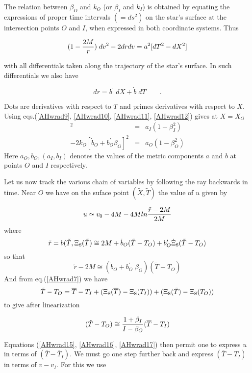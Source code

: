 \documentclass[12pt,oneside]{report}
\def\beq {\begin{equation}}
\def\feq {\end{equation}}
\begin{document}
{The relation between $ \beta_O $ and $ k_O$ (or $ \beta_I $
and $ k_I$) is obtained by equating the expressions  of proper time intervals
$(= ds^2)$  on the star's surface at the intersection
points $O$ and $I$, when expressed in both coordinate
systems. Thus

\beq (1 - {2 M \over r})\; dv^2 - 2 dr dv = a^2 [ d T^2 - d X^2
] \label{AHwrad11} \feq

\noindent with all differentials taken along the trajectory of
the star's surface. In such differentials we also have

\beq dr = b^\prime \; d X + {\dot b}\; d T \qquad .\label{AHwrad12} \feq

\noindent Dots are derivatives with respect to $T$ and primes derivatives 
with respect
to $X$. Using eqs.(\ref{AHwrad9}, \ref{AHwrad10}, \ref{AHwrad11}, \ref{AHwrad12}) gives
at $X = X_O$ 
\begin{eqnarray}
[ ( 1 - {2 M \over r_I}) \; k_I ^2 -  2 k_I ] [ {\dot b}_I +
b_I ^\prime \beta_I ]^2 &= &a_I (1 - \beta_I ^2 ) \label{AHwrad13} \\
-  2 k_O [ {\dot b}_O + b_O ^\prime \beta_O ] ^2& =& a_O (1 -
\beta_O^2)  \label{AHwrad14} 
\end{eqnarray}
\noindent Here $  a_O, b_O, (a_I, b_I)$ denotes the values of the metric components
$a$ and $b$ at points $O$ and $I$ respectively.

Let us now track the various chain of variables by following
the ray backwards in time. Near $O$ we have on the suface point
$ (\tilde X, \tilde T)$ the value of $u$ given by

\beq  u \simeq v_0 - 4 M - 4 M ln {\tilde r - 2 M \over 2 M}
\label{AHwrad15} \feq
\noindent where
$$  {\tilde r} = b ( {\tilde T}, \Xi_{\mbox{\rm s}} ({\tilde T}) \cong
2 M + \dot b_O ({\tilde T} - T_O) + b^\prime _O \dot \Xi_{\mbox{\rm s}} ({\tilde
T} - T_O) \nonumber $$
\noindent so that
\beq  {\tilde r} - 2 M \cong ({\dot b}_O + b^\prime _O \;\beta_O) (
{\tilde T} - T_O) \label{AHwrad16} \feq
\noindent And from eq.(\ref{AHwrad7}) we have
\beq  {\tilde T} - T_O = {\overline T} - T_I + ( \Xi_{\mbox{\rm s}}
({\overline T}) - \Xi_{\mbox{\rm s}} (T_I)) + (\Xi_{\mbox{\rm s}} ({\tilde T}) -
\Xi_{\mbox{\rm s}} (T_O)) \nonumber \feq
\noindent to give after linearization

\beq  ({\tilde T} - T_O) \cong {1 + \beta_I \over I - \beta_O}
({\overline T} - T_I) \label{AHwrad17} \feq



\noindent Equations (\ref{AHwrad15}, \ref{AHwrad16}, \ref{AHwrad17}) then permit
one to express $u$ in terms of $( {\overline T} - {\overline T}_I)$. We
must go one step further back and express $ ({\overline T} -
T_I)$ in terms of $ v - v_I$. For this we use 

}
\end{document}
